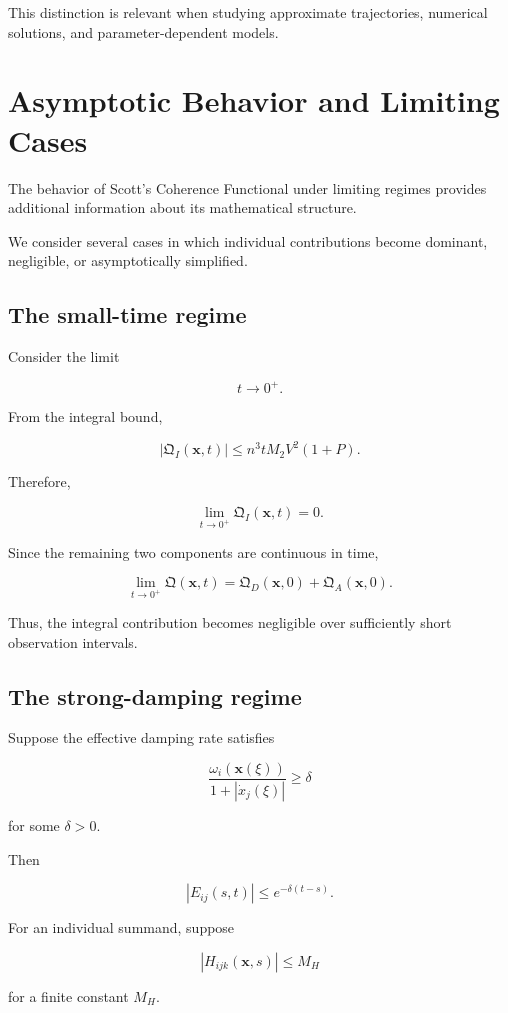 \documentclass[12pt]{article}
\numberwithin{equation}{section}
\newcommand{\Q}{\mathfrak{Q}}
\theoremstyle{definition}
\theoremstyle{remark}
\begin{document}
This distinction is relevant when studying
approximate trajectories, numerical solutions,
and parameter-dependent models.


\section{Asymptotic Behavior and Limiting Cases}

The behavior of Scott's Coherence Functional
under limiting regimes provides additional
information about its mathematical structure.

We consider several cases in which individual
contributions become dominant, negligible,
or asymptotically simplified.

\subsection{The small-time regime}

Consider the limit

\[
t\to0^+.
\]

From the integral bound,

\[
|\Q_I(\mathbf{x},t)|
\leq
n^3tM_2V^2(1+P).
\]

Therefore,

\[
\lim_{t\to0^+}
\Q_I(\mathbf{x},t)=0.
\]

Since the remaining two components are
continuous in time,

\[
\lim_{t\to0^+}
\Q(\mathbf{x},t)
=
\Q_D(\mathbf{x},0)
+
\Q_A(\mathbf{x},0).
\]

Thus, the integral contribution becomes
negligible over sufficiently short
observation intervals.

\subsection{The strong-damping regime}

Suppose the effective damping rate satisfies

\[
\frac{\omega_i(\mathbf{x}(\xi))}
{1+|\dot{x}_j(\xi)|}
\geq\delta
\]

for some \(\delta>0\).

Then

\[
|E_{ij}(s,t)|
\leq e^{-\delta(t-s)}.
\]

For an individual summand, suppose

\[
|H_{ijk}(\mathbf{x},s)|
\leq M_H
\]

for a finite constant \(M_H\).
\end{document}
